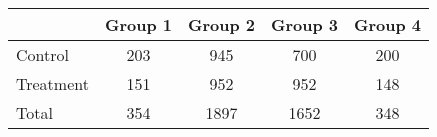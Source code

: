 {
\def\sym#1{\ifmmode^{#1}\else\(^{#1}\)\fi}
\begin{tabular}{l*{4}{c}}
\hline\hline
          &\multicolumn{1}{c}{Group 1}&\multicolumn{1}{c}{Group 2}&\multicolumn{1}{c}{Group 3}&\multicolumn{1}{c}{Group 4}\\
\hline
Control   &       203         &       945         &        700         &        200         \\
Treatment &       151         &       952         &        952         &        148         \\
\hline
Total     &       354         &       1897         &       1652         &       348         \\
\hline\hline
\end{tabular}
}
